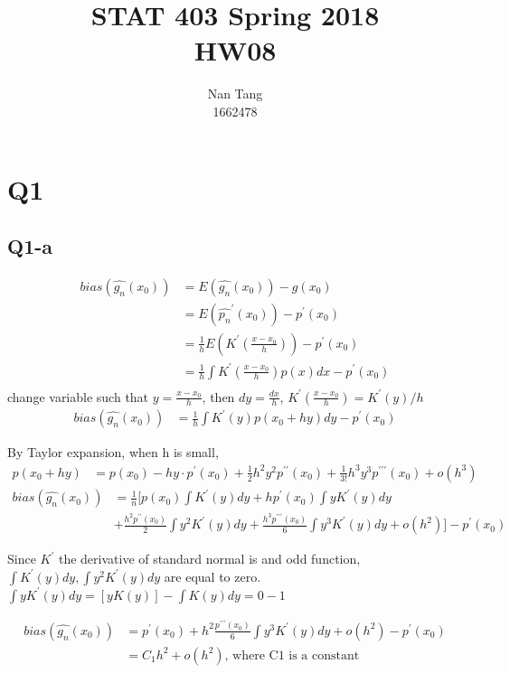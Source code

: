 \documentclass[12pt,letterpaper]{article}
\author{Nan Tang \\ 1662478}
\title{STAT 403 Spring 2018\\HW08}
\let\hat\widehat
\begin{document}
\maketitle

\section*{Q1}
\subsection*{Q1-a}
\begin{align*}
bias(\hat{g_n} (x_0)) &= E(\hat{g_n} (x_0)) - g(x_0) \\
&= E(\hat{p_n}^{\prime} (x_0)) - p^{\prime} (x_0) \\
&= \frac{1}{h} E(K^{\prime}(\frac{x - x_0}{h})) - p^{\prime} (x_0) \\
&= \frac{1}{h} \int K^{\prime}(\frac{x - x_0}{h}) p(x) dx - p^{\prime} (x_0) \\
\end{align*}
\noindent change variable such that $y = \frac{x-x_0}{h}$, then $dy = \frac{dx}{h}$, $K^{\prime}(\frac{x-x_0}{h}) = K^{\prime}(y)/h$
\begin{align*}
bias(\hat{g_n} (x_0)) &= \frac{1}{h} \int K^{\prime}(y) p(x_0 + hy) dy - p^{\prime} (x_0)
\end{align*}

\noindent By Taylor expansion, when h is small, 
\begin{align*}
p(x_0 + hy) &= p(x_0) - hy \cdot p^{\prime} (x_0) + \frac{1}{2} h^2 y^2 p^{\prime \prime}(x_0) + \frac{1}{3 !}h^3 y^3 p^{\prime\prime\prime}(x_0) + o(h^3)
\end{align*}
\begin{align*}
bias(\hat{g_n} (x_0)) &= \frac{1}{n}[ p(x_0)\int K^{\prime}(y) dy +  h p^{\prime}(x_0) \int yK^{\prime}(y) dy \\
&+  \frac{h^2 p^{\prime\prime}(x_0)}{2} \int  y^2 K^{\prime} (y)dy   + \frac{h^3 p^{\prime\prime\prime}(x_0)}{6} \int y^3 K^{\prime}(y) dy + o(h^2)] - p^{\prime} (x_0)
\end{align*}

\noindent Since $K^{\prime}$ the derivative of standard normal is and odd function, $\int K^{\prime}(y) dy, \int  y^2 K^{\prime} (y)dy$ are equal to zero.\\

\noindent $\int y K^{\prime}(y) dy = [yK(y)] - \int K(y) dy = 0 - 1$

\begin{align*}
bias(\hat{g_n} (x_0)) &= p^{\prime}(x_0) + h^2 \frac{p^{\prime\prime\prime}(x_0)}{6} \int y^3 K^{\prime}(y) dy + o(h^2) - p^{\prime}(x_0) \\
&= C_1 h^2 + o(h^2) \text{, where C1 is a constant} 
\end{align*}
\end{document}

